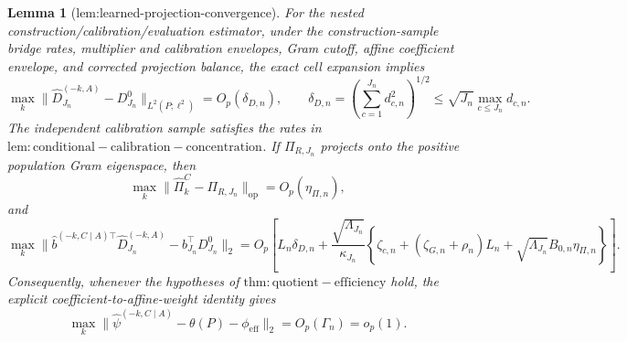 \documentclass{article}
\newtheorem{lemma}{Lemma}
\begin{document}
\begin{lemma}[lem:learned-projection-convergence]\label{lem:learned-projection-convergence}
For the nested construction/calibration/evaluation estimator, under the construction-sample bridge rates, multiplier and calibration envelopes, Gram cutoff, affine coefficient envelope, and corrected projection balance, the exact cell expansion implies
\[
 \max_k\|\widehat D_{J_n}^{(-k,A)}-D^0_{J_n}\|_{L^2(P;\ell^2)}=O_p(\delta_{D,n}),
 \qquad
 \delta_{D,n}=\left(\sum_{c=1}^{J_n}d_{c,n}^2\right)^{1/2}
 \le\sqrt{J_n}\max_{c\le J_n}d_{c,n}.
\]
The independent calibration sample satisfies the rates in \(\mathrm{lem:conditional-calibration-concentration}\).  If \(\Pi_{R,J_n}\) projects onto the positive population Gram eigenspace, then
\[
 \max_k\|\widehat\Pi_k^C-\Pi_{R,J_n}\|_{\mathrm{op}}=O_p(\eta_{\Pi,n}),
\]
and
\[
 \max_k\|\widehat b^{(-k,C\mid A)\top}\widehat D_{J_n}^{(-k,A)}
 -b_{J_n}^\top D^0_{J_n}\|_2
 =O_p\!\left[L_n\delta_{D,n}
 +\frac{\sqrt{\Lambda_{J_n}}}{\kappa_{J_n}}
 \left\{\zeta_{c,n}+(\zeta_{G,n}+\rho_n)L_n
 +\sqrt{\Lambda_{J_n}}B_{0,n}\eta_{\Pi,n}\right\}\right].
\]
Consequently, whenever the hypotheses of \(\mathrm{thm:quotient-efficiency}\) hold, the explicit coefficient-to-affine-weight identity gives
\[
 \max_k\|\widehat\psi^{(-k,C\mid A)}-\theta(P)-\phi_{\mathrm{eff}}\|_2
 =O_p(\Gamma_n)=o_p(1).
\]
\end{lemma}
\end{document}
